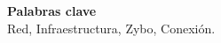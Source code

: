 \begin{center}
	\bigskip
	\bigskip
	\textbf{\huge {Palabras clave}}\\
	\bigskip
	Red, Infraestructura, Zybo, Conexión.
\end{center}